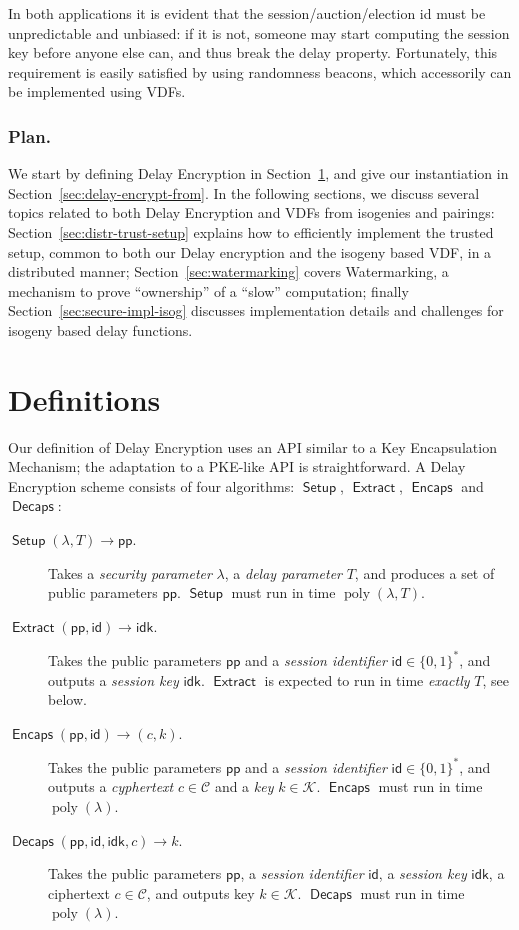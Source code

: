 \documentclass{llncs}
\DeclareMathOperator{\poly}{poly}
\DeclareMathOperator{\Setup}{\mathsf{Setup}}
\DeclareMathOperator{\Extract}{\mathsf{Extract}}
\DeclareMathOperator{\Encaps}{\mathsf{Encaps}}
\DeclareMathOperator{\Decaps}{\mathsf{Decaps}}
\newcommand{\pp}{\mathsf{pp}}
\newcommand{\id}{\mathsf{id}}
\newcommand{\idk}{\mathsf{idk}}
\newcommand{\keyspace}{\mathcal{K}}
\newcommand{\cipherspace}{\mathcal{C}}
\begin{document}
\medskip

In both applications it is evident that the session/auction/election
id must be unpredictable and unbiased: if it is not, someone may start
computing the session key before anyone else can, and thus break the
delay property. %
Fortunately, this requirement is easily satisfied by using randomness
beacons, which accessorily can be implemented using VDFs.

\subsubsection{Plan.}
We start by defining Delay Encryption in
Section~\ref{sec:definitions}, and give our instantiation in
Section~\ref{sec:delay-encrypt-from}. %
In the following sections, we discuss several topics related to both
Delay Encryption and VDFs from isogenies and pairings:
Section~\ref{sec:distr-trust-setup} explains how to efficiently
implement the trusted setup, common to both our Delay encryption and
the isogeny based VDF, in a distributed manner;
Section~\ref{sec:watermarking} covers Watermarking, a mechanism to
prove ``ownership'' of a ``slow'' computation; finally
Section~\ref{sec:secure-impl-isog} discusses implementation details
and challenges for isogeny based delay functions.


\section{Definitions}
\label{sec:definitions}

Our definition of Delay Encryption uses an API similar to a Key
Encapsulation Mechanism; the adaptation to a PKE-like API is
straightforward. A Delay Encryption scheme consists of four
algorithms: $\Setup$, $\Extract$, $\Encaps$ and $\Decaps$:

\begin{description}
\item[$\Setup(\lambda, T) \to \pp$.] %
  Takes a \emph{security parameter} $\lambda$, a \emph{delay
    parameter} $T$, and produces a set of public parameters $\pp$. %
  $\Setup$ must run in time $\poly(\lambda,T)$.
\item[$\Extract(\pp,\id) \to \idk$.] %
  Takes the public parameters $\pp$ and a \emph{session identifier}
  $\id\in\{0,1\}^*$, and outputs a \emph{session key} $\idk$. %
  $\Extract$ is expected to run in time \emph{exactly} $T$, see below.
\item[$\Encaps(\pp,\id)\to (c,k)$.] %
  Takes the public parameters $\pp$ and a \emph{session identifier}
  $\id\in\{0,1\}^*$, and outputs a \emph{cyphertext}
  $c\in\cipherspace$ and a \emph{key} $k\in\keyspace$. %
  $\Encaps$ must run in time $\poly(\lambda)$.
\item[$\Decaps(\pp,\id,\idk,c)\to k$.] %
  Takes the public parameters $\pp$, a \emph{session identifier}
  $\id$, a \emph{session key} $\idk$, a ciphertext $c\in\cipherspace$,
  and outputs key $k\in\keyspace$. %
  $\Decaps$ must run in time $\poly(\lambda)$.
\end{description}
\end{document}
